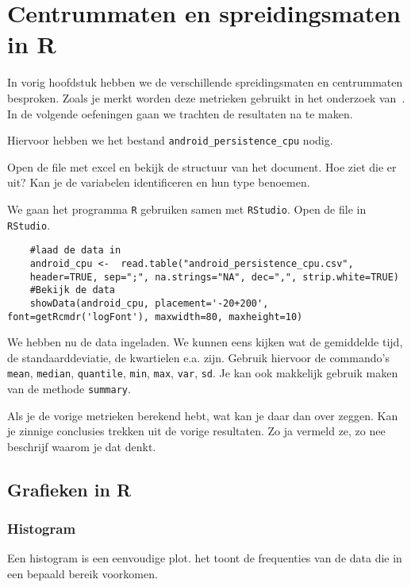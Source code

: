\section{Centrummaten en spreidingsmaten in R}
In vorig hoofdstuk hebben we de verschillende spreidingsmaten en centrummaten besproken. Zoals je merkt worden deze metrieken gebruikt in het onderzoek van~\textcite{Akin2016}. In de volgende oefeningen gaan we trachten de resultaten na te maken. 

Hiervoor hebben we het bestand \texttt{android\_persistence\_cpu} nodig. 

\begin{exercise}
	Open de file met excel en bekijk de structuur van het document. Hoe ziet die er uit? Kan je de variabelen identificeren en hun type benoemen. 
\end{exercise}

We gaan het programma \texttt{R} gebruiken samen met \texttt{RStudio}. Open de file in \texttt{RStudio}.

\begin{lstlisting}
	#laad de data in
	android_cpu <-  read.table("android_persistence_cpu.csv",
	header=TRUE, sep=";", na.strings="NA", dec=",", strip.white=TRUE)
	#Bekijk de data
	showData(android_cpu, placement='-20+200', font=getRcmdr('logFont'), maxwidth=80, maxheight=10)	
\end{lstlisting}

We hebben nu de data ingeladen. We kunnen eens kijken wat de gemiddelde tijd, de standaarddeviatie, de kwartielen e.a. zijn. Gebruik hiervoor de commando's \texttt{mean}, \texttt{median}, \texttt{quantile}, \texttt{min}, \texttt{max}, \texttt{var}, \texttt{sd}. Je kan ook makkelijk gebruik maken van de methode \texttt{summary}.

\begin{exercise}
	Als je de vorige metrieken berekend hebt, wat kan je daar dan over zeggen. Kan je zinnige conclusies trekken uit de vorige resultaten. Zo ja vermeld ze, zo nee beschrijf waarom je dat denkt.
\end{exercise}

\subsection{Grafieken in R}
\subsubsection{Histogram}
Een histogram is een eenvoudige plot. het toont de frequenties van de data die in een bepaald bereik voorkomen. 


